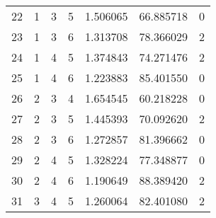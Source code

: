 \begin{tabular}{lrrrrrr}
22 &  1 &  3 &  5 &     1.506065 &            66.885718 &            0 \\
23 &  1 &  3 &  6 &     1.313708 &            78.366029 &            2 \\
24 &  1 &  4 &  5 &     1.374843 &            74.271476 &            2 \\
25 &  1 &  4 &  6 &     1.223883 &            85.401550 &            0 \\
26 &  2 &  3 &  4 &     1.654545 &            60.218228 &            0 \\
27 &  2 &  3 &  5 &     1.445393 &            70.092620 &            2 \\
28 &  2 &  3 &  6 &     1.272857 &            81.396662 &            0 \\
29 &  2 &  4 &  5 &     1.328224 &            77.348877 &            0 \\
30 &  2 &  4 &  6 &     1.190649 &            88.389420 &            2 \\
31 &  3 &  4 &  5 &     1.260064 &            82.401080 &            2 \\
\bottomrule
\end{tabular}
